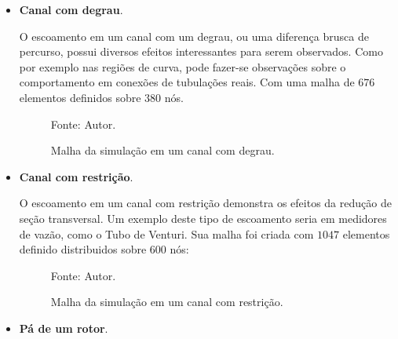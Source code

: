 \begin{itemize}
    \item \textbf{Canal com degrau}.

        O escoamento em um canal com um degrau, ou uma diferença brusca de percurso, possui diversos efeitos interessantes para serem observados.
        Como por exemplo nas regiões de curva, pode fazer-se observações sobre o comportamento em conexões de tubulações reais.
        Com uma malha de $676$ elementos definidos sobre $380$ nós.
        \begin{figure}[H]
            \centering
             {\raggedleft \scriptsize Fonte: Autor.}
            \caption{Malha da simulação em um canal com degrau.}
            \label{step_mesh}
        \end{figure}

    \item \textbf{Canal com restrição}.

        O escoamento em um canal com restrição demonstra os efeitos da redução de seção transversal.
        Um exemplo deste tipo de escoamento seria em medidores de vazão, como o Tubo de Venturi. 
        Sua malha foi criada com $1047$ elementos definido distribuidos sobre $600$ nós:
        \begin{figure}[H]
            \centering
             {\raggedleft \scriptsize Fonte: Autor.}
            \caption{Malha da simulação em um canal com restrição.}
            \label{nozzle_mesh}
        \end{figure}

    \item \textbf{Pá de um rotor}.


\end{itemize}

